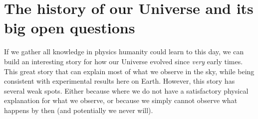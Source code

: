 \chaptertoc{}

\vspace{1em}



\section{The history of our Universe and its big open questions}
\label{intro:history_questions}

    If we gather all knowledge in physics humanity could learn to this day, 
    we can build an interesting story for how our Universe evolved since 
    \emph{very} early times. This great story that can explain most of what 
    we observe in the sky, while being consistent with experimental results here on Earth.  
    However, this story has several weak spots. Either because where we do not have 
    a satisfactory physical explanation for what we observe, or 
    because we simply cannot observe what happens by then (and potentially we never will).

